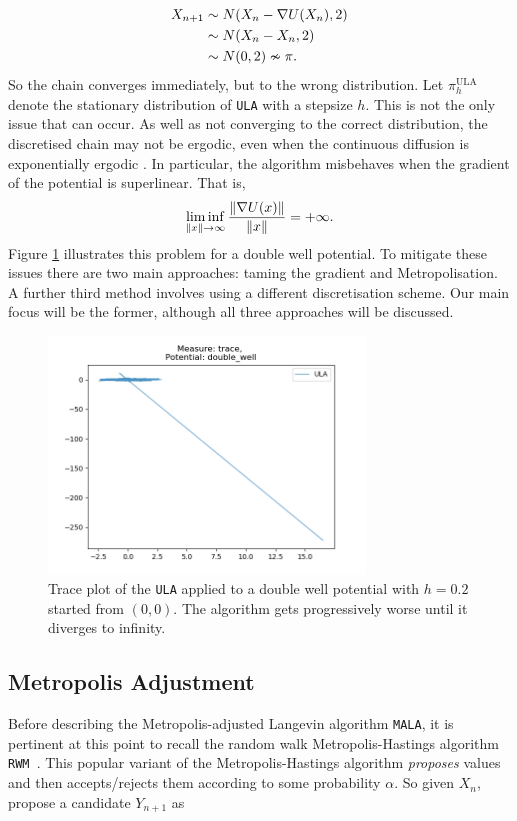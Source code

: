 \begin{align*}
	X_{n+1} &\sim N(X_n - \nabla U(X_n), 2)\\
	& \sim  N(X_n - X_n, 2)\\
	& \sim N(0,2) \nsim \pi .
\end{align*}
So the chain converges immediately, but to the wrong distribution. Let \(\pi^{\text{ULA}}_{h} \) denote the stationary distribution of \texttt{ULA} with a stepsize \(h\). This is not the only issue that can occur. As well as not converging to the correct distribution, the discretised chain may not be  ergodic, even when the continuous diffusion is exponentially ergodic \cite{RT96}. In particular, the algorithm misbehaves when the gradient of the potential is superlinear. That is,
\[\liminf_{\|x\|\to \infty} \frac{\|\nabla U(x)\|}{\|x\|} = +\infty. \]
Figure \ref{fig:ULAdiverge} illustrates this problem for a double well potential. To mitigate these issues there are two main approaches: taming the gradient and Metropolisation. A further third method involves using a different discretisation scheme.  Our main focus will be the former, although all three approaches will be discussed.
\begin{figure}
    \centering
    \includegraphics[width=0.75\textwidth]{Figures/ula_doublewell_divergence_step0_2_trace.png}
    \caption{Trace plot of the \texttt{ULA} applied to a double well potential with \(h=0.2\) started from \((0,0)\). The algorithm gets progressively worse until it diverges to infinity.}
    \label{fig:ULAdiverge}
\end{figure}
\subsection{Metropolis Adjustment}
Before describing the Metropolis-adjusted Langevin algorithm \texttt{MALA}, it is pertinent at this point to recall the random walk Metropolis-Hastings algorithm \texttt{RWM }\cite{Hastings70, Metropolis53}. This popular variant of the Metropolis-Hastings algorithm \emph{proposes} values and then accepts/rejects them according to some probability \(\alpha\).  So given \(X_n\), propose a candidate \(Y_{n+1}\) as

